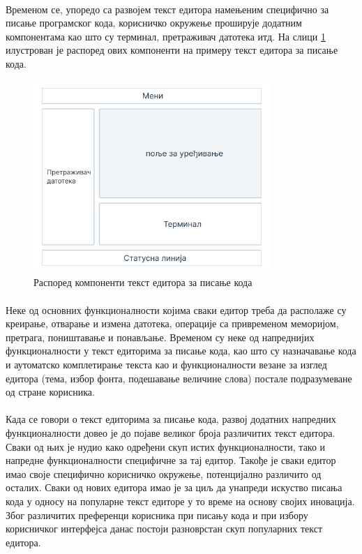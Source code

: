 \documentclass[12pt,oneside]{memoir}
\begin{document}
\paragraph{}
Временом се, упоредо са развојем текст едитора намењеним специфично за писање
програмског кода, корисничко окружење проширује додатним компонентама као што су терминал, претраживач датотека итд. На слици \ref{fig:layout} илустрован је распоред ових
компоненти на примеру текст едитора за писање кода. \cite{TextEditors}

\begin{figure}[!ht]
	\centering
	\includegraphics[width=0.8\textwidth]{images/raspored.png}
	\caption{Распоред компоненти текст едитора за писање кода}
	\label{fig:layout}
\end{figure}

\paragraph{}
Неке од основних функционалности којима сваки едитор треба да располаже су креирање, отварање
и измена датотека, операције са привременом меморијом, претрага, поништавање и 
понављање. Временом су неке од напреднијих функционалности у текст едиторима
за писање кода, као што су назначавање кода и аутоматско комплетирање текста као и
функционалности везане за изглед едитора (тема, избор фонта, подешавање величине слова)
постале подразумеване од стране корисника.

\paragraph{}
Када се говори о текст едиторима за писање кода, развој додатних напредних функционалности
довео је до појаве великог броја различитих текст едитора. Сваки од њих је нудио како
одређени скуп истих функционалности, тако и напредне функционалности специфичне за тај
едитор. Такође је сваки едитор имао своје специфично корисничко окружење, потенцијално различито од осталих. Сваки од нових едитора имао је за циљ да унапреди искуство писања кода у односу на популарне
текст едиторе у то време на основу својих иновација. Због различитих преференци корисника
при писању кода и при избору корисничког интерфејса данас постоји разноврстан скуп
популарних текст едитора.
\end{document}
